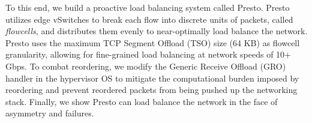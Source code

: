 %
%
%

To this end, we build a proactive load balancing system called Presto.
Presto utilizes edge vSwitches to break each flow into discrete units of packets, called 
{\em flowcells}, and distributes them evenly 
to near-optimally load balance the network. 
Presto uses the maximum TCP Segment Offload (TSO) size (64 KB) as flowcell granularity, 
allowing for fine-grained load balancing at network speeds of 10+ Gbps.  
To combat reordering, we modify the Generic Receive Offload (GRO) handler
in the hypervisor OS to mitigate the computational burden imposed by reordering
and prevent reordered packets from being pushed up the networking stack.
Finally, we show Presto can load balance the network
in the face of asymmetry and failures.


